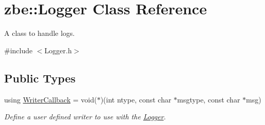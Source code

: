 \hypertarget{classzbe_1_1_logger}{}\section{zbe\+:\+:Logger Class Reference}
\label{classzbe_1_1_logger}


A class to handle logs.  




{\ttfamily \#include $<$Logger.\+h$>$}

\subsection*{Public Types}
\begin{DoxyCompactItemize}
\item 
using \hyperlink{classzbe_1_1_logger_a6b5096e1cd8e8af221619572797cc838}{Writer\+Callback} = void($\ast$)(int ntype, const char $\ast$msgtype, const char $\ast$msg)
\begin{DoxyCompactList}\small\item\em Define a user defined writer to use with the \hyperlink{classzbe_1_1_logger}{Logger}. \end{DoxyCompactList}\end{DoxyCompactItemize}
